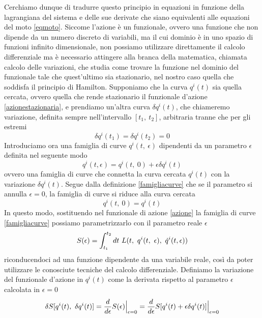     Cerchiamo dunque di tradurre questo principio in equazioni in funzione della lagrangiana del sistema e delle sue derivate che siano equivalenti alle equazioni del moto \eqref{eqmoto}. Siccome l'azione è un funzionale, ovvero una funzione che non dipende da un numero discreto di variabili, ma il cui dominio è in uno spazio di funzioni infinito dimensionale, non possiamo utilizzare direttamente il calcolo differenziale ma è necessario attingere alla branca della matematica, chiamata calcolo delle variazioni, che studia come trovare la funzione nel dominio del funzionale tale che quest'ultimo sia stazionario, nel nostro caso quella che soddisfa il principio di Hamilton. Supponiamo che la curva $q^i(t)$ sia quella cercata, ovvero quella che rende stazionario il funzionale d'azione \eqref{azionestazionaria}, e prendiamo un'altra curva $\delta q^i(t)$, che chiameremo variazione, definita sempre nell'intervallo $[t_1, ~t_2]$, arbitraria tranne che per gli estremi
    \begin{equation} \label{estreminulli}
        \delta q^i(t_1) = \delta q^i(t_2) = 0
    \end{equation}
    Introduciamo ora una famiglia di curve $q^i(t, ~\epsilon)$ dipendenti da un parametro $\epsilon$ definita nel seguente modo 
    \begin{equation} \label{famigliacurve}
        q^i(t, \epsilon) = q^i(t, ~0) + \epsilon \delta q^i(t)
    \end{equation}
    ovvero una famiglia di curve che connetta la curva cercata $q^i(t)$ con la variazione $\delta q^i(t)$. Segue dalla definizione \eqref{famigliacurve} che se il parametro si annulla $\epsilon=0$, la famiglia di curve si riduce alla curva cercata
    \begin{equation*}
        q^i(t, ~ 0) = q^i(t)
    \end{equation*}
    In questo modo, sostituendo nel funzionale di azione \eqref{azione} la famiglia di curve \eqref{famigliacurve} possiamo parametrizzarlo con il parametro reale $\epsilon$
    \begin{equation*}
        S(\epsilon) = \int_{t_1}^{t_2}dt~ L(t, ~q^i(t, ~\epsilon), ~\dot q^i(t, \epsilon))
    \end{equation*}
    riconducendoci ad una funzione dipendente da una variabile reale, così da poter utilizzare le conosciute tecniche del calcolo differenziale. Definiamo la variazione del funzionale d'azione in $q^i(t)$ come la derivata rispetto al parametro $\epsilon$ calcolata in $\epsilon = 0$
    \begin{equation} \label{variazioneazione}
        \delta S[q^i(t), ~ \delta q^i(t)] = \frac{d}{d\epsilon} S(\epsilon) \Big \vert_{\epsilon = 0} = \frac{d}{d\epsilon} S[q^i(t) + \epsilon \delta q^i(t)] \Big \vert_{\epsilon = 0}
    \end{equation}
